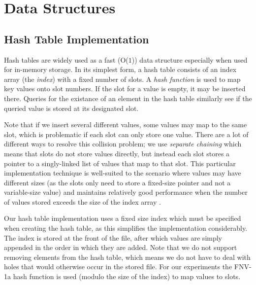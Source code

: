 \documentclass{acm_proc_article-sp}
\begin{document}
\section{Data Structures}

\subsection{Hash Table Implementation}
Hash tables are widely used as a fast (O($1$)) data structure especially when
used for in-memory storage. In its simplest form, a hash table consists of an
index array (the \emph{index}) with a fixed number of slots. A \emph{hash
function} is used to map key values onto slot numbers. If the slot for a value
is empty, it may be inserted there. Queries for the existance of an element in
the hash table similarly see if the queried value is stored at its designated
slot.

Note that if we insert several different values, some values may map to the
same slot, which is problematic if each slot can only store one value. There
are a lot of different ways to resolve this collision problem; we use
\emph{separate chaining} which means that slots do not store values directly,
but instead each slot stores a pointer to a singly-linked list of values that
map to that slot. This particular implementation technique is well-suited to
the scenario where values may have different sizes (as the slots only need to
store a fixed-size pointer and not a variable-size value) and maintains
relatively good performance when the number of values stored exceeds the size
of the index array \cite{sedgewick1998ac}.


Our hash table implementation uses a fixed size index which must be specified
when creating the hash table, as this simplifies the implementation
considerably. The index is stored at the front of the file, after which values
are simply appended in the order in which they are added. Note that we do not
support removing elements from the hash table, which means we do not have to
deal with holes that would otherwise occur in the stored file. For our
experiments the FNV-1a hash function \cite{noll2004fnv} is used (modulo the
size of the index) to map values to slots.
\end{document}
